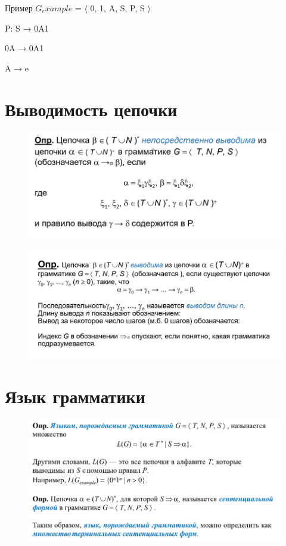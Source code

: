 \documentclass{article}
\begin{document}
Пример
$G_example$ = $\langle$ {0, 1}, {A, S}, P, S $\rangle$

P: S → 0A1

0A → 0A1

A → e

\section{Выводимость цепочки}

\begin{figure}[H]
    \centering
    \includegraphics[width=1\linewidth]{Снимок экрана 2025-02-20 090552.png}
    
\end{figure}

\begin{figure}[H]
    \centering
    \includegraphics[width=1\linewidth]{Снимок экрана 2025-02-20 090612.png}
\end{figure}

\section{Язык грамматики}

\begin{figure} [H]
    \centering
    \includegraphics[width=1\linewidth]{Снимок экрана 2025-02-20 091501.png}
\end{figure}
\end{document}

